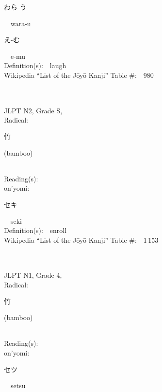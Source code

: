 \begin{multicols}{2}
{\hspace*{2em}}{\begin{CJK}{UTF8}{min} わら-う \end{CJK}}\ \ wara-u\ \ \\
{\hspace*{2em}}{\begin{CJK}{UTF8}{min} え-む \end{CJK}}\ \ e-mu\ \ \\
Definition(s):\ \ laugh \\
Wikipedia ``List of the J\=oy\=o Kanji'' Table \#:\ \ 980 \\
\ \ \\
{\fontsize{34pt}{40pt}  }\ \ \\  %
{JLPT N2, Grade S, \\Radical:\ \ {\begin{CJK}{UTF8}{min} 竹 \end{CJK}} (bamboo) } \\
Reading(s):\ \ \\
{\hspace*{1em}}on'yomi:\ \ \\
{\hspace*{2em}}{\begin{CJK}{UTF8}{min} セキ \end{CJK}}\ \ seki\ \ \\
Definition(s):\ \ enroll \\
Wikipedia ``List of the J\=oy\=o Kanji'' Table \#:\ \ 1\,153 \\
\ \ \\
{\fontsize{34pt}{40pt}  }\ \ \\  %
{JLPT N1, Grade 4, \\Radical:\ \ {\begin{CJK}{UTF8}{min} 竹 \end{CJK}} (bamboo) } \\
Reading(s):\ \ \\
{\hspace*{1em}}on'yomi:\ \ \\
{\hspace*{2em}}{\begin{CJK}{UTF8}{min} セツ \end{CJK}}\ \ setsu\ \ \\

\end{multicols}
